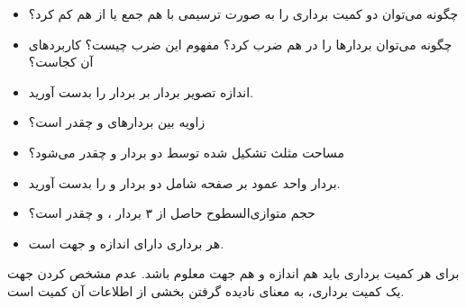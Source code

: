 \begin{ELunit}


\begin{itemize}
\tightlist
\item
  چگونه می‌توان دو کمیت برداری را به صورت ترسیمی با هم جمع یا از هم کم کرد؟
\item
  چگونه می‌توان بردارها را در هم ضرب کرد؟ مفهوم این ضرب چیست؟ کاربردهای آن کجاست؟
\end{itemize}


\begin{itemize}
\tightlist
\item
  اندازه تصویر بردار  بر بردار  را بدست آورید.
\item
  زاویه بین بردارهای  و  چقدر است؟
\item
  مساحت مثلث تشکیل شده توسط دو بردار  و  چقدر می‌شود؟
\item
  بردار واحد عمود بر صفحه شامل دو بردار  و  را بدست آورید.
\item
  حجم متوازی‌السطوح حاصل از ۳ بردار ،  و  چقدر است؟
\end{itemize}

\end{ELunit}

\ELhold


\begin{ELunit}

\begin{itemize}
\tightlist
\item
  هر برداری دارای اندازه و جهت است.
\end{itemize}



\end{ELunit}

\begin{ELremark}{}

برای هر کمیت برداری باید هم اندازه و هم جهت معلوم باشد. عدم مشخص کردن جهت یک کمیت برداری، به معنای نادیده گرفتن بخشی از اطلاعات آن کمیت است.

\end{ELremark}


